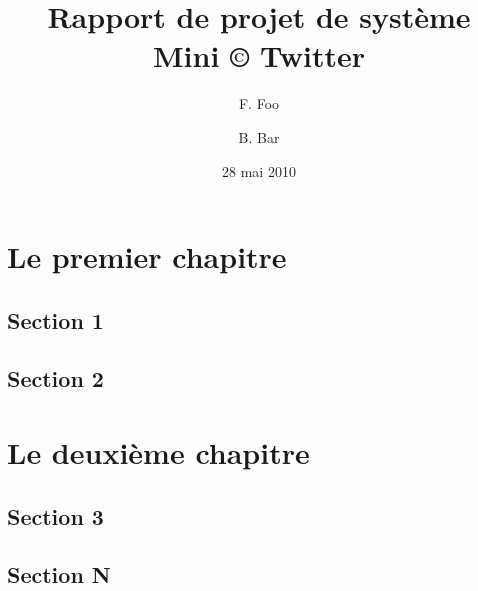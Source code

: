 \documentclass[a4paper,times]{report}
\title{Rapport de projet de système\\Mini © Twitter}
\author{
F. Foo
\and
B. Bar
}
\date{28 mai 2010}
\begin{document}
\maketitle

\tableofcontents

\chapter{Le premier chapitre}

\section{Section 1}

\section{Section 2}

\chapter{Le deuxième chapitre}

\section{Section 3}

\section{Section N}
\end{document}
